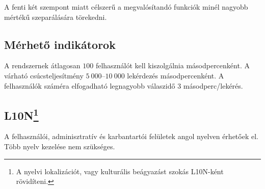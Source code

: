 A fenti két szempont miatt célszerű a megvalósítandó funkciók minél nagyobb mértékű szeparálására törekedni.


\subsection{Mérhető indikátorok}\label{sec:indikatorok}
A rendszernek átlagosan $100$ felhasználót kell kiszolgálnia másodpercenként. A várható csúcsteljesítmény $5~000$--$10~000$ lekérdezés másodpercenként. A felhasználók száméra elfogadható legnagyobb válaszidő 3 másodperc/lekérés.


\subsection[L10N]{L10N\footnote{A nyelvi lokalizációt, vagy kulturális beágyazást szokás L10N-ként rövidíteni.}}
A felhasználói, adminisztratív és karbantartói felületek angol nyelven érhetőek el. Több nyelv kezelése nem szükséges.
